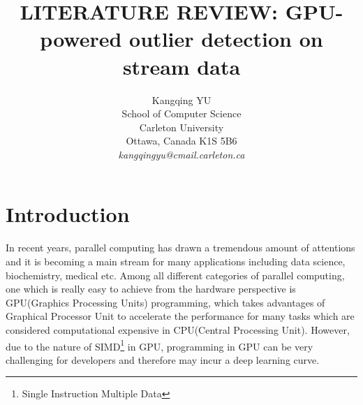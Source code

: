 \documentclass[11pt]{article}       %
\begin{document}


\title{LITERATURE REVIEW: GPU-powered outlier detection on stream data}


\author{
Kangqing YU\\
School of Computer Science\\
Carleton University\\
Ottawa, Canada K1S 5B6\\
{\em kangqingyu@cmail.carleton.ca}
} %

\maketitle



\section{Introduction} \label{intro}

In recent years, parallel computing has drawn a tremendous amount of attentions and it is becoming a main stream for many applications including data science, biochemistry, medical etc. Among all different categories of parallel computing, one which is really easy to achieve from the hardware perspective is GPU(Graphics Processing Units) programming, which takes advantages of Graphical Processor Unit to accelerate the performance for many tasks which are considered computational expensive in CPU(Central Processing Unit). 
However, due to the nature of SIMD\footnote{Single Instruction Multiple Data} in GPU, programming in GPU can be very challenging for developers and therefore may incur a deep learning curve. 
\end{document}
